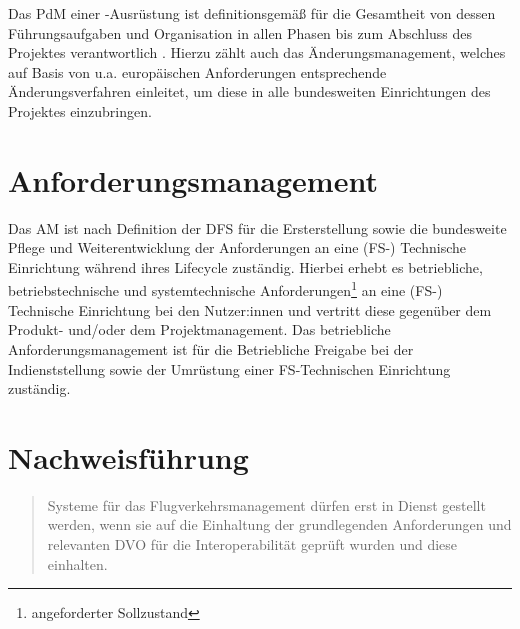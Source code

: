 
Das \ac{PdM} einer \atmans-Ausrüstung ist definitionsgemäß für die Gesamtheit von dessen Führungsaufgaben und Organisation in allen Phasen bis zum Abschluss des Projektes verantwortlich \cite[31]{ba_technik}.
Hierzu zählt auch das Änderungsmanagement, welches auf Basis von u.a. europäischen Anforderungen entsprechende Änderungsverfahren einleitet, um diese in alle bundesweiten Einrichtungen des Projektes einzubringen. 


\pagebreak
    \section{Anforderungsmanagement}

Das \acf{AM} ist nach Definition der \ac{DFS} für die Ersterstellung sowie die bundesweite Pflege und Weiterentwicklung der Anforderungen an eine (FS-) Technische Einrichtung während ihres Lifecycle zuständig. 
Hierbei erhebt es betriebliche, betriebstechnische und systemtechnische Anforderungen\footnote{angeforderter Sollzustand} an eine (FS-)  Technische Einrichtung bei den Nutzer:innen und vertritt diese gegenüber dem Produkt- und/oder dem Projektmanagement. 
Das betriebliche Anforderungsmanagement ist für die Betriebliche Freigabe bei der Indienststellung sowie der Umrüstung einer FS-Technischen Einrichtung zuständig. \cite[31]{ba_technik}


    \section{Nachweisführung}

\begin{quote}
    Systeme für das Flugverkehrsmanagement dürfen erst in Dienst gestellt werden, wenn sie auf die
Einhaltung der grundlegenden Anforderungen und relevanten DVO für die Interoperabilität
geprüft wurden und diese einhalten. \cite[17]{baf_iop}
\end{quote}


